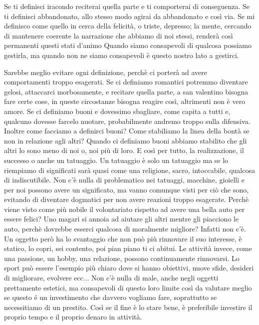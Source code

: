 \documentclass[12pt]{book} %
\begin{document}
Se ti definisci iracondo reciterai quella parte e ti
comporterai di conseguenza. Se ti definisci abbandonato, allo stesso modo agirai da abbandonato e così via. 
Se mi definisco come quello in cerca della felicità, o triste, depresso; la mente, cercando di mantenere coerente la narrazione che abbiamo di noi stessi, renderà così permanenti questi stati d'animo
Quando siamo consapevoli di qualcosa possiamo gestirla, ma quando non ne siamo consapevoli è questo nostro lato a gestirci.

Sarebbe meglio evitare ogni definizione, perchè ci porterà ad avere comportamenti troppo esagerati.
Se ci definiamo romantici potremmo diventare gelosi, attaccarci morbosamente, e recitare quella parte, a san valentino bisogna fare certe cose, in queste circostanze bisogna reagire così, altrimenti non è vero amore. Se ci definiamo buoni e dovessimo sbagliare, come capita a tutti e, qualcuno dovesse farcelo nuotare, probabilmente andremo troppo sulla difensiva. 
Inoltre come facciamo a definirci buoni? Come stabiliamo la linea della bontà se non in relazione agli altri? Quando ci definiamo buoni abbiamo stabilito che gli altri lo sono meno di noi o, noi più di loro. E così per tutto, la realizzazione, il successo o anche un tatuaggio. Un tatuaggio è solo un tatuaggio ma se lo riempiamo di significati sarà quasi come una religione, sacro, intoccabile, qualcosa di indiscutibile. Non c'è nulla di problematico nei tatuaggi, macchine, gioielli e per noi possono avere un significato, ma vanno comunque visti per ciò che sono, evitando di diventare dogmatici per non avere reazioni troppo esagerate.
Perchè viene visto come più nobile il volontariato rispetto ad avere una bella auto per essere felici? Uno magari si annoia ad aiutare gli altri mentre gli piacciono le auto, perchè dovrebbe esserci qualcosa di moralmente migliore? Infatti non c'è.
Un oggetto però ha lo svantaggio che non può più rinnovare il suo interesse, è statico, lo copri, sei contento, poi pian piano ti ci abitui. Le attività invece, come una passione, un hobby, una relazione, possono continuamente rinnovarsi. Lo sport può essere l'esempio più chiaro dove si hanno obiettivi, nuove sfide, desideri di migliorare, evolvere ecc... Non c'è nulla di male, anche negli oggetti prettamente estetici, ma consapevoli di questo loro limite così da valutare meglio se questo é un investimento che davvero vogliamo fare, soprattutto se necessitiamo di un prestito. Così se il fine è lo stare bene, è preferibile investire il proprio tempo e il proprio denaro in attività.
\end{document}
